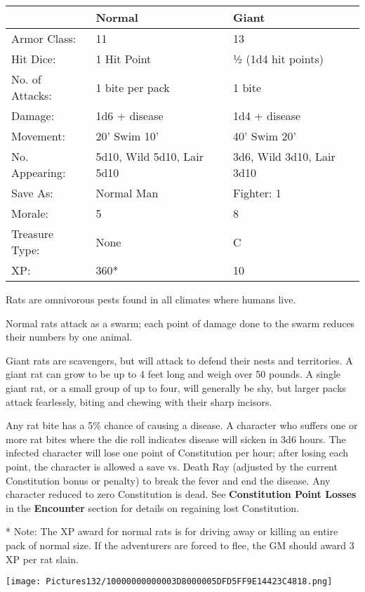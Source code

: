 \documentclass[a4paper,twoside,openany,10pt]{book}
\begin{document}
\begin{multicols}{2}
\begin{tabularx}{0.50\textwidth}{@{}lXX@{}}
& Normal & Giant \\\hline
Armor Class: & 11 & 13 \\\hline
Hit Dice: & 1 Hit Point & ½ (1d4 hit points) \\\hline
No. of Attacks: & 1 bite per pack & 1 bite \\\hline
Damage: & 1d6 + disease & 1d4 + disease \\\hline
Movement: & 20' Swim 10' &
40' Swim 20' \\\hline
No. Appearing: & 5d10, Wild 5d10,  Lair 5d10 & 3d6, Wild 3d10, Lair 3d10 \\\hline
Save As: & Normal Man & Fighter: 1 \\\hline
Morale: & 5 & 8 \\\hline
Treasure Type: & None & C \\\hline
XP: & 360* & 10 \\\hline
\end{tabularx}

Rats are omnivorous pests found in all climates where humans live.

Normal rats attack as a swarm; each point of damage done to the swarm reduces their numbers by one animal.


Giant rats are scavengers, but will attack to defend their nests and territories. A giant rat can grow to be up to 4 feet long and weigh over 50 pounds. A single giant rat, or a small group of up to four, will generally be shy, but larger packs attack fearlessly, biting and chewing with their sharp incisors.

Any rat bite has a 5\% chance of causing a disease. A character who suffers  one or more rat bites where the die roll indicates disease will sicken in 3d6 hours. The infected character will lose one point of Constitution per hour; after losing each point, the character is allowed a save vs. Death Ray (adjusted by the current Constitution bonus or penalty) to break the fever and end the disease. Any character reduced to zero Constitution is dead. See \textbf{Constitution Point Losses} in the \textbf{Encounter} section for details on regaining lost Constitution. 

* Note: The XP award for normal rats is for driving away or killing an entire pack of normal size. If the adventurers are forced to flee, the
GM should award 3 XP per rat slain.

\begin{center}
	\texttt{[image: Pictures132/10000000000003D8000005DFD5FF9E14423C4818.png]}
\end{center}



\end{multicols}
\end{document}
